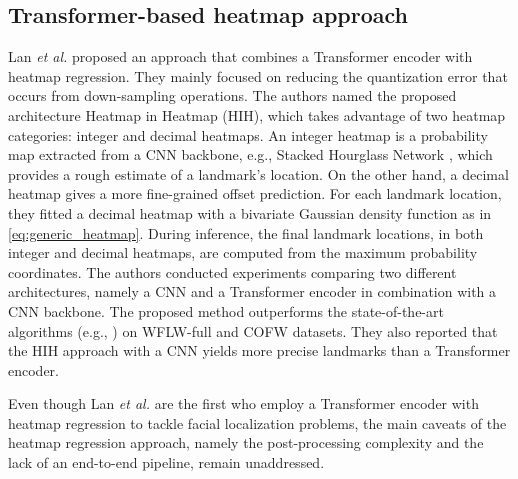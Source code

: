 \documentclass[journal]{IEEEtran}
\begin{document}
\subsection{Transformer-based heatmap approach}\label{subsec:transformer_heatmap}

Lan \textit{et al.} \cite{lan2021hih} proposed an approach that combines a Transformer encoder with heatmap regression.
They mainly focused on reducing the quantization error that occurs from down-sampling operations. 
The authors named the proposed architecture Heatmap in Heatmap (HIH), which takes advantage of two heatmap categories: integer and decimal heatmaps.
An integer heatmap is a probability map extracted from a CNN backbone, e.g., Stacked Hourglass Network \cite{Newell2016}, which provides a rough estimate of a landmark's location.
On the other hand, a decimal heatmap gives a more fine-grained offset prediction. 
For each landmark location, they fitted a decimal heatmap with a bivariate Gaussian density function as in \eqref{eq:generic_heatmap}.
During inference, the final landmark locations, in both integer and decimal heatmaps, are computed from the maximum probability coordinates.
The authors conducted experiments comparing two different architectures, namely a CNN and a Transformer encoder in combination with a CNN backbone.
The proposed method outperforms the state-of-the-art algorithms (e.g., \cite{Wu2018, Wang2019c, Kumar2020, Feng2017}) on WFLW-full \cite{Wu2018} and COFW \cite{Burgos2013} datasets.
They also reported that the HIH approach with a CNN yields more precise landmarks than a Transformer encoder.

Even though Lan \textit{et al.} \cite{lan2021hih} are the first who employ a Transformer encoder with heatmap regression to tackle facial localization problems, the main caveats of the heatmap regression approach, namely the post-processing complexity and the lack of an end-to-end pipeline, remain unaddressed.
\end{document}
